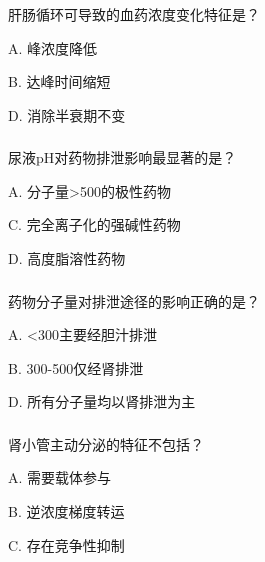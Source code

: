 \documentclass[dvipsnames, svgnames, x11names]{beamer}
\begin{document}
\begin{frame}[t]
    \frametitle{}
    \begin{question}
        肝肠循环可导致的血药浓度变化特征是？
        \tcblower

        A. 峰浓度降低

        B. 达峰时间缩短


        D. 消除半衰期不变
    \end{question}
\end{frame}


\begin{frame}[t]
    \frametitle{}
    \begin{question}
        尿液pH对药物排泄影响最显著的是？
        \tcblower

        A. 分子量>500的极性药物


        C. 完全离子化的强碱性药物

        D. 高度脂溶性药物
    \end{question}
\end{frame}


\begin{frame}[t]
    \frametitle{}
    \begin{question}
        药物分子量对排泄途径的影响正确的是？
        \tcblower

        A. <300主要经胆汁排泄

        B. 300-500仅经肾排泄


        D. 所有分子量均以肾排泄为主
    \end{question}
\end{frame}


\begin{frame}[t]
    \frametitle{}
    \begin{question}
        肾小管主动分泌的特征不包括？
        \tcblower

        A. 需要载体参与

        B. 逆浓度梯度转运

        C. 存在竞争性抑制

    \end{question}
\end{frame}
\end{document}
